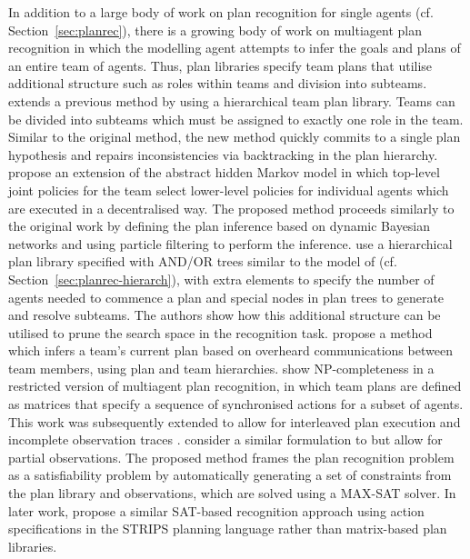 \documentclass[final,1p,times,authoryear]{elsarticle}
\begin{document}
In addition to a large body of work on plan recognition for single agents (cf. Section~\ref{sec:planrec}), there is a growing body of work on multiagent plan recognition in which the modelling agent attempts to infer the goals and plans of an entire team of agents. Thus, plan libraries specify team plans that utilise additional structure such as roles within teams and division into subteams. \citet{t1996} extends a previous method \citep[][cf. Section~\ref{sec:planrec-hierarch}]{tr1995} by using a hierarchical team plan library. Teams can be divided into subteams which must be assigned to exactly one role in the team. Similar to the original method, the new method quickly commits to a single plan hypothesis and repairs inconsistencies via backtracking in the plan hierarchy. \citet{sm2004} propose an extension of the abstract hidden Markov model \citep[][cf. Section~\ref{sec:planrec-hierarch}]{bvw2002} in which top-level joint policies for the team select lower-level policies for individual agents which are executed in a decentralised way. The proposed method proceeds similarly to the original work by defining the plan inference based on dynamic Bayesian networks and using particle filtering to perform the inference. \citet{ss2008} use a hierarchical plan library specified with AND/OR trees similar to the model of \citet{gg2009} (cf. Section~\ref{sec:planrec-hierarch}), with extra elements to specify the number of agents needed to commence a plan and special nodes in plan trees to generate and resolve subteams. The authors show how this additional structure can be utilised to prune the search space in the recognition task. \citet{kpt2002} propose a method which infers a team's current plan based on overheard communications between team members, using plan and team hierarchies. \citet{bkl2010} show NP-completeness in a restricted version of multiagent plan recognition, in which team plans are defined as matrices that specify a sequence of synchronised actions for a subset of agents. This work was subsequently extended to allow for interleaved plan execution and incomplete observation traces \citep{bk2011}. \citet{zl2011} consider a similar formulation to \citet{bkl2010} but allow for partial observations. The proposed method frames the plan recognition problem as a satisfiability problem by automatically generating a set of constraints from the plan library and observations, which are solved using a MAX-SAT solver. In later work, \citet{zyk2012} propose a similar SAT-based recognition approach using action specifications in the STRIPS planning language rather than matrix-based plan libraries.
\end{document}
